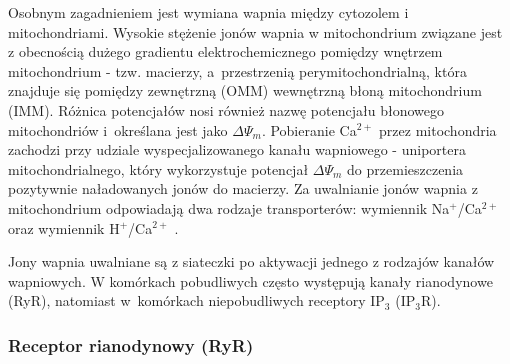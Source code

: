 Osobnym zagadnieniem jest wymiana wapnia między cytozolem i mitochondriami. Wysokie stężenie jonów wapnia w mitochondrium związane jest z obecnością dużego gradientu elektrochemicznego pomiędzy wnętrzem mitochondrium - tzw. macierzy, a~przestrzenią perymitochondrialną, która znajduje się pomiędzy zewnętrzną (OMM) wewnętrzną błoną mitochondrium (IMM). Różnica potencjałów nosi również nazwę potencjału błonowego mitochondriów i~określana jest jako $\Delta\Psi_m$. Pobieranie Ca$^{2+}$ przez mitochondria zachodzi przy udziale wyspecjalizowanego kanału wapniowego - uniportera mitochondrialnego, który wykorzystuje potencjał $\Delta\Psi_m$ do przemieszczenia pozytywnie naładowanych jonów do macierzy. Za uwalnianie jonów wapnia z mitochondrium odpowiadają dwa rodzaje transporterów: wymiennik Na$^+$/Ca$^{2+}$ oraz wymiennik H$^+$/Ca$^{2+}$ \cite{Laude2009}.

Jony wapnia uwalniane są z siateczki po aktywacji jednego z rodzajów kanałów wapniowych. W komórkach pobudliwych często występują kanały rianodynowe (RyR), natomiast w~komórkach niepobudliwych receptory IP$_3$ (IP$_3$R).

\subsubsection{Receptor rianodynowy (RyR)}

